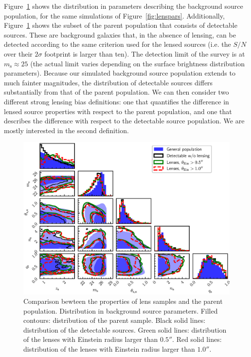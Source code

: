 \documentclass{aa}
\def\msource{m_{\mathrm{s}}}
\def\Fref#1{Figure~\ref{#1}\xspace}
\begin{document}
\Fref{fig:sourcepars} shows the distribution in parameters describing the background source population, for the same simulations of \Fref{fig:lenspars}. 
Additionally, \Fref{fig:sourcepars} shows the subset of the parent population that consists of detectable sources.
These are background galaxies that, in the absence of lensing, can be detected according to the same criterion used for the lensed sources (i.e. the $S/N$ over their $2\sigma$ footprint is larger than ten).
The detection limit of the survey is at $\msource\approx25$ (the actual limit varies depending on the surface brightness distribution parameters).
Because our simulated background source population extends to much fainter magnitudes, the distribution of detectable sources differs substantially from that of the parent population.
We can then consider two different strong lensing bias definitions: one that quantifies the difference in lensed source properties with respect to the parent population, and one that describes the difference with respect to the detectable source population. We are mostly interested in the second definition.

\begin{figure}
\includegraphics[width=\textwidth]{source_cornerplot.eps}
\caption{
Comparison bewteen the properties of lens samples and the parent population. Distribution in background source parameters.
Filled contours: distribution of the parent sample.
Black solid lines: distribution of the detectable sources.
Green solid lines: distribution of the lenses with Einstein radius larger than $0.5''$.
Red solid lines: distribution of the lenses with Einstein radius larger than $1.0''$.
\label{fig:sourcepars}
}
\end{figure}
\end{document}
